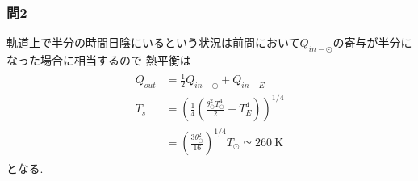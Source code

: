 \documentclass[uplatex,a4j,11pt,dvipdfmx]{jsarticle}
\begin{document}
\subsubsection*{問2}
軌道上で半分の時間日陰にいるという状況は前問において$Q_{in-\odot}$の寄与が半分になった場合に相当するので
熱平衡は
\begin{align}
  \begin{split}
    Q_{out}&=\frac{1}{2}Q_{in-\odot}+Q_{in-E}\\
    T_s&=\left(\frac{1}{4}(\frac{\theta_\odot^2 T_\odot^4}{2}+T_E^4)\right)^{1/4}\\
    &=\left(\frac{3\theta_\odot^2}{16}\right)^{1/4}T_\odot\simeq 260\ \si{\kelvin}
  \end{split}
\end{align}
となる.
\end{document}
